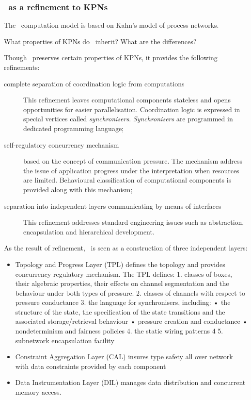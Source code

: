     \subsubsection{\ak\ as a refinement to KPNs}
The \ak\ computation model is based on Kahn's model of process networks.


What properties of KPNs do \ak\ inherit? What are the differences?



Though \ak\ preserves certain properties of KPNs, it provides the following refinements:
\begin{description}
\item[complete separation of coordination logic from computations]

This refinement leaves computational components stateless and opens opportunities for easier parallelisation. Coordination logic is expressed in special vertices called \emph{synchronisers}. \emph{Synchronisers} are programmed in dedicated programming language;
\item[self-regulatory concurrency mechanism] based on the concept of communication pressure. The mechanism address the issue of application progress under the interpretation when resources are limited. Behavioural classification of computational components is provided along with this mechanism;
\item[separation into independent layers communicating by means of interfaces]

This refinement addresses standard engineering issues such as abstraction, encapsulation and hierarchical development.
\end{description}

As the result of refinement, \ak\ is seen as a construction of three independent layers:
\begin{itemize}
\item Topology and Progress Layer (TPL) defines the topology and provides concurrency regulatory mechanism.
The TPL defines:
1. classes of boxes, their algebraic properties, their effects on channel segmentation and the behaviour under both types of pressure.
2. classes of channels with respect to pressure conductance 3. the language for synchronisers, including:
• the structure of the state, the specification of the state transitions and the associated storage/retrieval behaviour
• pressure creation and conductance • nondeterminism and fairness policies
4. the static wiring patterns 4
5. subnetwork encapsulation facility

\item Constraint Aggregation Layer (CAL) insures type safety all over network with data constraints provided by each component

\item Data Instrumentation Layer (DIL) manages data distribution and concurrent memory access.
\end{itemize}




